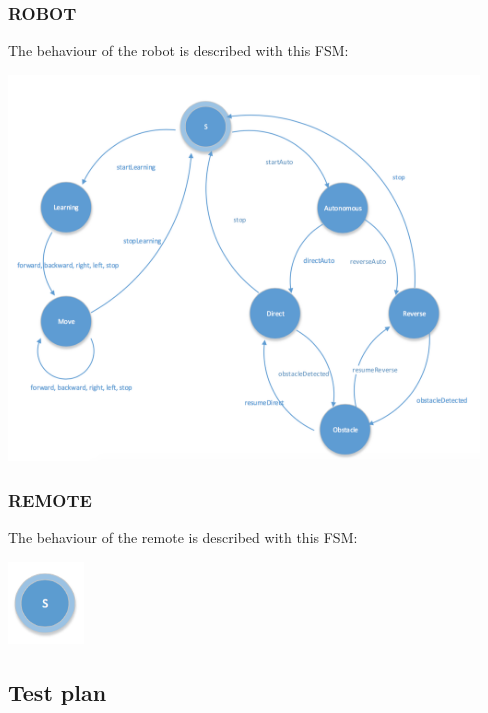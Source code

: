 \documentclass{llncs}
\newcommand{\labelsec}[1]{\label{sec:#1}}
\begin{document}
\subsubsection{ROBOT}
The behaviour of the robot is described with this FSM:\\
\begin{center}
   	\includegraphics[width=12.5cm]{img/fsmRobot.png}\\
\end{center}
\subsubsection{REMOTE}
The behaviour of the remote is described with this FSM:\\
\begin{center}
   	\includegraphics[width=2cm]{img/fsmRemoteRequirementAnalysis.png}\\
\end{center}
\subsection{Test plan}
\labelsec{Test plan}
\end{document}
